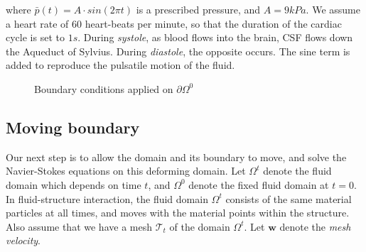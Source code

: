 \documentclass[a4paper,11pt,openright,twoside]{book}
\newcommand{\mesh}{\mathcal{T}_t}
\begin{document}
where $\bar{p}(t) = A \cdot sin(2\pi t)$ is a prescribed pressure, and $A = 9kPa$. We assume a heart rate of $60$ heart-beats per minute, so that the duration of the cardiac cycle is set to $1s$. During \textit{systole}, as blood flows into the brain, CSF flows down the Aqueduct of Sylvius. During \textit{diastole}, the opposite occurs. The sine term is added to reproduce the pulsatile motion of the fluid. 

\begin{figure}


  \caption{Boundary conditions applied on $\partial \Omega^0$}
\end{figure}


\subsection{Moving boundary}
Our next step is to allow the domain and its boundary to move, and
solve the Navier-Stokes equations on this deforming domain. Let $\Omega^t$ denote the fluid domain which depends on time $t$, and
$\Omega^0$ denote the fixed fluid domain at $t = 0$. In
fluid-structure interaction, the fluid domain $\Omega^t$ consists of
the same material particles at all times, and moves with the material
points within the structure. Also assume that we have a mesh $\mesh$
of the domain $\Omega^t$. Let $\mathbf{w}$ denote the \emph{mesh velocity}.
  

\end{document}
